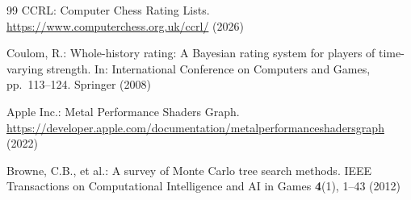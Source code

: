 \documentclass{svproc}
\begin{document}
\begin{thebibliography}{99}
CCRL: Computer Chess Rating Lists. \url{https://www.computerchess.org.uk/ccrl/} (2026)

Coulom, R.: Whole-history rating: A Bayesian rating system for players of time-varying strength. In: International Conference on Computers and Games, pp.~113--124. Springer (2008)

Apple Inc.: Metal Performance Shaders Graph. \url{https://developer.apple.com/documentation/metalperformanceshadersgraph} (2022)

Browne, C.B., et al.: A survey of Monte Carlo tree search methods. IEEE Transactions on Computational Intelligence and AI in Games \textbf{4}(1), 1--43 (2012)

\end{thebibliography}
\end{document}
